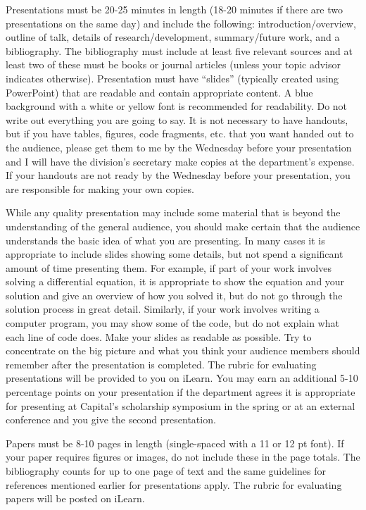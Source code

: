 \documentclass[11pt]{article}
\begin{document}
\flushleft

Presentations must be 20-25 minutes in length (18-20 minutes if there are two presentations on the same day) and include the following: introduction/overview, outline of talk, details of research/development, summary/future work, and a bibliography. The bibliography must include at least five relevant sources and at least two of these must be books or journal articles (unless your topic advisor indicates otherwise). Presentation must have ``slides'' (typically created using PowerPoint) that are readable and contain appropriate content. A blue background with a white or yellow font is recommended for readability. Do not write out everything you are going to say. It is not necessary to have handouts, but if you have tables, figures, code fragments, etc. that you want handed out to the audience, please get them to me by the Wednesday before your presentation and I will have the division's secretary make copies at the department's expense. If your handouts are not ready by the Wednesday before your presentation, you are responsible for making your own copies.

\flushleft

While any quality presentation may include some material that is beyond the understanding of the general audience, you should make certain that the audience understands the basic idea of what you are presenting. In many cases it is appropriate to include slides showing some details, but not spend a significant amount of time presenting them. For example, if part of your work involves solving a differential equation, it is appropriate to show the equation and your
solution and give an overview of how you solved it, but do not go through the solution process in great detail. Similarly, if your work involves writing a computer program, you may show some of the code,
but do not explain what each line of code does.  Make your slides as readable as possible. Try to concentrate on the big picture and what you think your audience members should remember after the presentation is completed. The rubric for evaluating presentations will be provided to you on iLearn. You may earn an additional 5-10 percentage points on your presentation if the department agrees it is appropriate for presenting at Capital's scholarship symposium in the spring or at an external conference and you give the second presentation.

\flushleft

Papers must be 8-10 pages in length (single-spaced with a 11 or 12 pt font). If your paper requires figures or images, do not include these in the page totals. The bibliography counts for up to one page of text and the same guidelines for references mentioned earlier for presentations apply. The rubric for evaluating papers will be posted on iLearn. 
\end{document}
